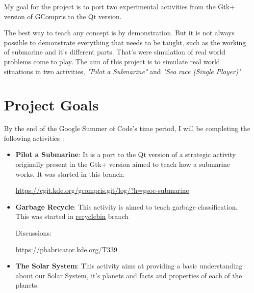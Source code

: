 \documentclass[preprint,12pt]{elsarticle}
\begin{document}

My goal for the project is to port two experimental activities from the Gtk+ version of GCompris to the Qt version.

The best way to teach any concept is by demonstration. But it is not always possible to demonstrate everything that needs to be taught, such as the working of submarine and it's different parts. That's were simulation of real world problems come to play. The aim of this project is to simulate real world situations in two activities, \textit{"Pilot a Submarine"} and \textit{"Sea race (Single Player)"}

\section{Project Goals}
\label{S:1}

By the end of the Google Summer of Code's time period, I will be completing the following activities :

\begin{itemize}

\item \textbf{Pilot a Submarine}: It is a port to the Qt version of a strategic activity originally present in the Gtk+ version aimed to teach how a submarine works. It was started in this branch: 

\href{https://cgit.kde.org/gcompris.git/log/?h=gsoc-submarine}{https://cgit.kde.org/gcompris.git/log/?h=gsoc-submarine}

\item \textbf{Garbage Recycle}: This activity is aimed to teach garbage classification. This was started in \href{https://cgit.kde.org/gcompris.git/log/?h=SoK_Activity_recyclebin_shivansh} {recyclebin} branch

Discussions:

\href{https://phabricator.kde.org/T339}{https://phabricator.kde.org/T339}

\item \textbf{The Solar System}: This activity aims at providing a basic understanding about our Solar System, it's planets and facts and properties of each of the planets.
\end{itemize}
\end{document}
